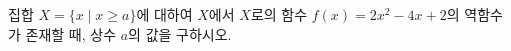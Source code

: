 \hspace*{2mm}\begin{minipage}[t]{\dimexpr\linewidth-2mm\relax}\vspace{0pt}
집합 $X=\{x \mid x\ge a\}$에 대하여 $X$에서 $X$로의 함수 $f(x)=2x^2-4x+2$의 역함수가 존재할 때, 상수 $a$의 값을 구하시오.\end{minipage}
